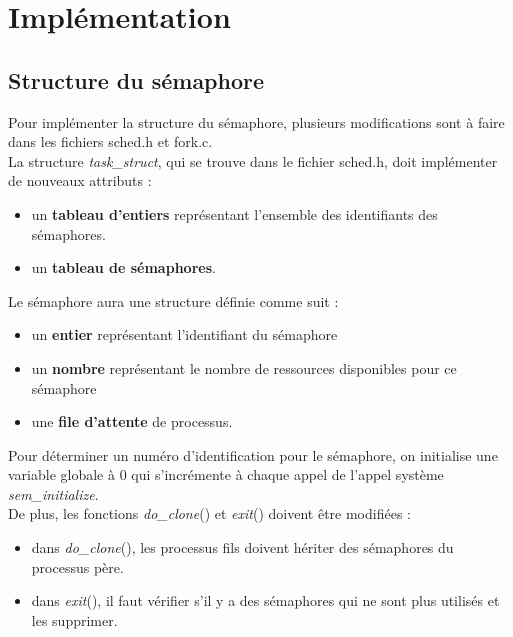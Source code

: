 \documentclass[12pt]{article}
\begin{document}
\newpage
\section{Implémentation}
    \subsection{Structure du sémaphore}
      Pour implémenter la structure du sémaphore, plusieurs modifications sont à faire dans les fichiers sched.h et fork.c.\\

      La structure \textit{task\_struct}, qui se trouve dans le fichier sched.h, doit implémenter de nouveaux attributs :
      \begin{itemize}
        \item un \textbf{tableau d'entiers} représentant l'ensemble des identifiants des sémaphores.
        \item un \textbf{tableau de sémaphores}.\\
      \end{itemize}

      Le sémaphore aura une structure définie comme suit :
      \begin{itemize}
        \item un \textbf{entier} représentant l'identifiant du sémaphore
        \item un \textbf{nombre} représentant le nombre de ressources disponibles pour ce sémaphore
        \item une \textbf{file d'attente} de processus.\\
      \end{itemize}
      Pour déterminer un numéro d'identification pour le sémaphore, on initialise une variable globale à 0 qui s'incrémente à chaque appel de l'appel système \textit{sem\_initialize}.\\

      De plus, les fonctions \textit{do\_clone}() et \textit{exit}() doivent être modifiées :
      \begin{itemize}
        \item dans \textit{do\_clone}(), les processus fils doivent hériter des sémaphores du processus père.
        \item dans \textit{exit}(), il faut vérifier s'il y a des sémaphores qui ne sont plus utilisés et les supprimer.\\
      \end{itemize}
\end{document}
